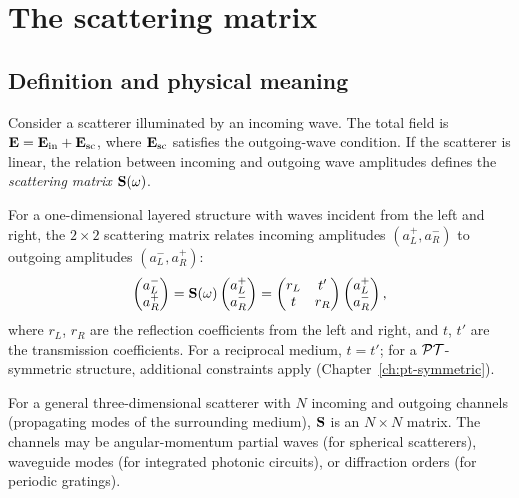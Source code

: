 \section{The scattering matrix}
\label{sec:smatrix}

\subsection{Definition and physical meaning}
\label{ssec:smatrix-def}

Consider a scatterer illuminated by an incoming wave. The total field is
$\mathbf{E} = \mathbf{E}_{\mathrm{in}} + \mathbf{E}_{\mathrm{sc}}$, where $\mathbf{E}_{\mathrm{sc}}$
satisfies the outgoing-wave condition. If the scatterer is linear, the
relation between incoming and outgoing wave amplitudes defines the
\emph{scattering matrix} $\mathbf{S}(\omega)$.

For a one-dimensional layered structure with waves incident from the left
and right, the $2\times 2$ scattering matrix relates incoming amplitudes
$(a_L^+, a_R^-)$ to outgoing amplitudes $(a_L^-, a_R^+)$:
\begin{equation}
 \begin{pmatrix} a_L^- \\ a_R^+ \end{pmatrix}
 = \mathbf{S}(\omega)
 \begin{pmatrix} a_L^+ \\ a_R^- \end{pmatrix}
 = \begin{pmatrix} r_L & t' \\ t & r_R \end{pmatrix}
 \begin{pmatrix} a_L^+ \\ a_R^- \end{pmatrix},
 \label{eq:smatrix-1d}
\end{equation}
where $r_L$, $r_R$ are the reflection coefficients from the left and right,
and $t$, $t'$ are the transmission coefficients. For a reciprocal medium,
$t = t'$; for a $\mathcal{PT}$-symmetric structure, additional constraints apply
(Chapter~\ref{ch:pt-symmetric}).

For a general three-dimensional scatterer with $N$ incoming and outgoing
channels (propagating modes of the surrounding medium), $\mathbf{S}$ is an
$N\times N$ matrix. The channels may be angular-momentum partial waves
(for spherical scatterers), waveguide modes (for integrated photonic
circuits), or diffraction orders (for periodic gratings).

